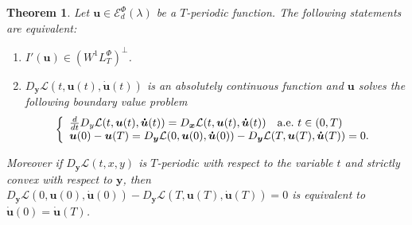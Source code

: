 \documentclass[twoside]{article}
\newtheorem{thm}{Theorem}[section]
\theoremstyle{remark}
\newcommand{\lphi}{L^{\Phi}}
\newcommand{\wphi}{W^{1}\lphi}
\newcommand{\domi}{\mathcal{E}^{\Phi}_d(\lambda)}
\renewcommand{\b}[1]{\boldsymbol{#1}}
\newcommand{\ccdot}{\b{\cdot}}
\begin{document}
\begin{thm}\label{critpoint} Let $\b{u}\in\domi$ be  a $T$-periodic function. The following statements are equivalent:
\begin{enumerate}
 \item $I'(\b{u})\in\left( \wphi_T\right)^{\perp}$.
 \item  $D_{\b{y}}\mathcal{L}(t,\b{u}(t),\b{\dot{u}}(t))$ is an absolutely continuous function and $\b{u}$ solves the following boundary value problem
 \begin{equation}\label{ecualagran2}
    \left\{%
\begin{array}{ll}
   \frac{d}{dt} D_{y}\mathcal{L}(t,\b{u}(t),\b{\dot{u}}(t))= D_{\b{x}}\mathcal{L}(t,\b{u}(t),\b{\dot{u}}(t)) \quad \hbox{a.e.}\ t \in (0,T)\\
    \b{u}(0)-\b{u}(T)=D_{\b{y}}\mathcal{L}(0,\b{u}(0),\b{\dot{u}}(0))-D_{\b{y}}\mathcal{L}(T,\b{u}(T),\b{\dot{u}}(T))=0.
\end{array}%
\right.
\end{equation}
\end{enumerate}
Moreover if $D_{\b{y}}\mathcal{L}(t,x,y)$ is $T$-periodic with respect to the variable $t$ and strictly convex with respect to $\b{y}$, then
$D_{\b{y}}\mathcal{L}(0,\b{u}(0),\b{\b{\dot{\b{u}}}}(0))-D_{\b{y}}\mathcal{L}(T,\b{u}(T),\b{\dot{u}}(T))=0$ is equivalent to $\b{\dot{u}}(0)=\b{\dot{u}}(T)$.
\end{thm}

%
\end{document}
